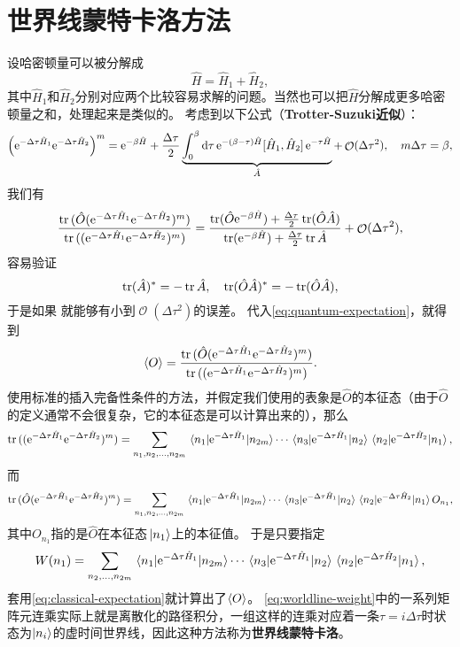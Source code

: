 \documentclass[hyperref, UTF8, a4paper]{ctexart}
\newcommand*{\ee}{\mathrm{e}}
\DeclareMathOperator{\bigO}{\mathcal{O}}
\newcommand*{\concept}[1]{{\textbf{#1}}}
\begin{document}
\section{世界线蒙特卡洛方法}\label{sec:worldline-mc}

设哈密顿量可以被分解成
\begin{equation}
    \hat{H} = \hat{H}_1 + \hat{H}_2,
\end{equation}
其中$\hat{H}_1$和$\hat{H}_2$分别对应两个比较容易求解的问题。当然也可以把$\hat{H}$分解成更多哈密顿量之和，处理起来是类似的。
考虑到以下公式（\concept{Trotter-Suzuki近似}）：
\begin{equation}
    \left( \ee^{-\Delta \tau \hat{H}_1} \ee^{- \Delta \tau \hat{H}_2} \right)^m = \ee^{-\beta \hat{H}} + \frac{\Delta \tau}{2} \underbrace{\int_0^\beta \dd{\tau} \ee^{-(\beta-\tau) \hat{H}} \comm*{\hat{H}_1}{\hat{H}_2} \ee^{-\tau \hat{H}}}_{\hat{A}} + \bigO(\Delta \tau^2), \quad m \Delta \tau = \beta,
\end{equation}
我们有
\[
    \frac{\trace{(\hat{O} ( \ee^{-\Delta \tau \hat{H}_1} \ee^{- \Delta \tau \hat{H}_2} )^m)}}{\trace{(( \ee^{-\Delta \tau \hat{H}_1} \ee^{- \Delta \tau \hat{H}_2} )^m)}} = \frac{\trace(\hat{O} \ee^{-\beta \hat{H}}) + \frac{\Delta \tau}{2} \trace(\hat{O} \hat{A})}{\trace(\ee^{-\beta \hat{H}}) + \frac{\Delta \tau}{2} \trace\hat{A}} + \bigO(\Delta \tau^2),
\]
容易验证
\[
    \trace(\hat{A})^* = - \trace \hat{A}, \quad \trace(\hat{O} \hat{A})^* = - \trace(\hat{O} \hat{A}),
\]
于是如果
就能够有小到$\bigO(\Delta \tau^2)$的误差。
代入\eqref{eq:quantum-expectation}，就得到
\[
    \expval{O} = \frac{\trace{(\hat{O} ( \ee^{-\Delta \tau \hat{H}_1} \ee^{- \Delta \tau \hat{H}_2} )^m)}}{\trace{(( \ee^{-\Delta \tau \hat{H}_1} \ee^{- \Delta \tau \hat{H}_2} )^m)}}.
\]
使用标准的插入完备性条件的方法，并假定我们使用的表象是$\hat{O}$的本征态（由于$\hat{O}$的定义通常不会很复杂，它的本征态是可以计算出来的），那么
\[
    \trace{(( \ee^{-\Delta \tau \hat{H}_1} \ee^{- \Delta \tau \hat{H}_2} )^m)} = \sum_{n_1, n_2, \ldots, n_{2m}} \mel{n_1}{\ee^{-\Delta \tau \hat{H}_1}}{n_{2m}} \cdots \mel{n_3}{\ee^{-\Delta \tau \hat{H}_1}}{n_2} \mel{n_2}{\ee^{-\Delta \tau \hat{H}_2}}{n_1},
\]
而
\[
    \trace{(\hat{O} ( \ee^{-\Delta \tau \hat{H}_1} \ee^{- \Delta \tau \hat{H}_2} )^m)} = \sum_{n_1, n_2, \ldots, n_{2m}} \mel{n_1}{\ee^{-\Delta \tau \hat{H}_1}}{n_{2m}} \cdots \mel{n_3}{\ee^{-\Delta \tau \hat{H}_1}}{n_2} \mel{n_2}{\ee^{-\Delta \tau \hat{H}_2}}{n_1} O_{n_1},
\]
其中$O_{n_1}$指的是$\hat{O}$在本征态$\ket*{n_1}$上的本征值。
于是只要指定
\begin{equation}
    W(n_1) = \sum_{n_2, \ldots, n_{2m}} \mel{n_1}{\ee^{-\Delta \tau \hat{H}_1}}{n_{2m}} \cdots \mel{n_3}{\ee^{-\Delta \tau \hat{H}_1}}{n_2} \mel{n_2}{\ee^{-\Delta \tau \hat{H}_2}}{n_1},
    \label{eq:worldline-weight}
\end{equation}
套用\eqref{eq:classical-expectation}就计算出了$\expval{O}$。
\eqref{eq:worldline-weight}中的一系列矩阵元连乘实际上就是离散化的路径积分，一组这样的连乘对应着一条$\tau=i \Delta \tau$时状态为$\ket{n_i}$的虚时间世界线，因此这种方法称为\concept{世界线蒙特卡洛}。
\end{document}
